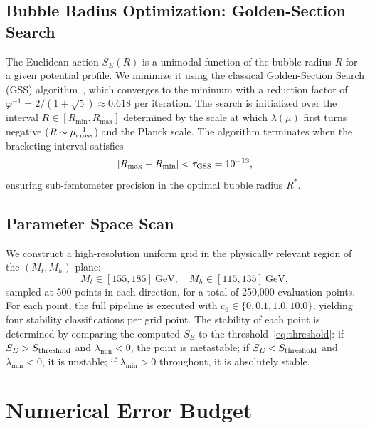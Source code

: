 \documentclass[aps,prd,twocolumn,superscriptaddress,nofootinbib]{revtex4-2}
\begin{document}
\subsection{Bubble Radius Optimization: Golden-Section Search}
\label{subsec:golden}

The Euclidean action $S_E(R)$ is a unimodal function of the bubble
radius $R$ for a given potential profile. We minimize it using the
classical Golden-Section Search (GSS) algorithm~\cite{Kiefer:1953gss},
which converges to the minimum with a reduction factor of $\varphi^{-1}
= 2/(1+\sqrt{5}) \approx 0.618$ per iteration. The search is initialized
over the interval $R \in [R_{\min}, R_{\max}]$ determined by the scale
at which $\lambda(\mu)$ first turns negative ($R \sim \mu^{-1}_{\rm cross}$)
and the Planck scale. The algorithm terminates when the bracketing interval
satisfies
\begin{equation}
    |R_{\rm max} - R_{\rm min}| < \tau_{\rm GSS} = 10^{-13},
    \label{eq:gss_tol}
\end{equation}
ensuring sub-femtometer precision in the optimal bubble radius $R^*$.

\subsection{Parameter Space Scan}
\label{subsec:scan}

We construct a high-resolution uniform grid in the physically relevant
region of the $(M_t, M_h)$ plane:
\begin{equation}
    M_t \in [155, 185]~\text{GeV}, \quad
    M_h \in [115, 135]~\text{GeV},
    \label{eq:param_range}
\end{equation}
sampled at 500 points in each direction, for a total of 250,000 evaluation
points. For each point, the full pipeline is executed with
$c_6 \in \{0, 0.1, 1.0, 10.0\}$, yielding four stability classifications
per grid point. The stability of each point is determined by comparing
the computed $S_E$ to the threshold~\eqref{eq:threshold}: if $S_E > S_{\rm threshold}$
and $\lambda_{\min} < 0$, the point is metastable; if $S_E < S_{\rm threshold}$
and $\lambda_{\min} < 0$, it is unstable; if $\lambda_{\min} > 0$ throughout,
it is absolutely stable.

\section{Numerical Error Budget}
\label{sec:errors}
\end{document}
